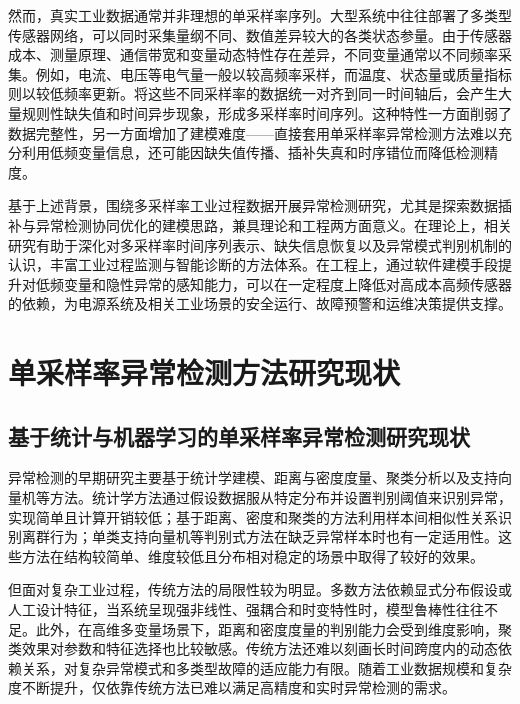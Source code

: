 \documentclass[bachelor, vlined]{DissertUESTC}
\begin{document}
    然而，真实工业数据通常并非理想的单采样率序列。大型系统中往往部署了多类型传感器网络，可以同时采集量纲不同、数值差异较大的各类状态参量。由于传感器成本、测量原理、通信带宽和变量动态特性存在差异，不同变量通常以不同频率采集。例如，电流、电压等电气量一般以较高频率采样，而温度、状态量或质量指标则以较低频率更新。将这些不同采样率的数据统一对齐到同一时间轴后，会产生大量规则性缺失值和时间异步现象，形成多采样率时间序列。这种特性一方面削弱了数据完整性，另一方面增加了建模难度——直接套用单采样率异常检测方法难以充分利用低频变量信息，还可能因缺失值传播、插补失真和时序错位而降低检测精度。

    基于上述背景，围绕多采样率工业过程数据开展异常检测研究，尤其是探索数据插补与异常检测协同优化的建模思路，兼具理论和工程两方面意义。在理论上，相关研究有助于深化对多采样率时间序列表示、缺失信息恢复以及异常模式判别机制的认识，丰富工业过程监测与智能诊断的方法体系。在工程上，通过软件建模手段提升对低频变量和隐性异常的感知能力，可以在一定程度上降低对高成本高频传感器的依赖，为电源系统及相关工业场景的安全运行、故障预警和运维决策提供支撑。

	\section{单采样率异常检测方法研究现状}

	\subsection{基于统计与机器学习的单采样率异常检测研究现状}

    异常检测的早期研究主要基于统计学建模、距离与密度度量、聚类分析以及支持向量机等方法。统计学方法通过假设数据服从特定分布并设置判别阈值来识别异常，实现简单且计算开销较低；基于距离、密度和聚类的方法利用样本间相似性关系识别离群行为；单类支持向量机等判别式方法在缺乏异常样本时也有一定适用性。这些方法在结构较简单、维度较低且分布相对稳定的场景中取得了较好的效果。

    但面对复杂工业过程，传统方法的局限性较为明显。多数方法依赖显式分布假设或人工设计特征，当系统呈现强非线性、强耦合和时变特性时，模型鲁棒性往往不足。此外，在高维多变量场景下，距离和密度度量的判别能力会受到维度影响，聚类效果对参数和特征选择也比较敏感。传统方法还难以刻画长时间跨度内的动态依赖关系，对复杂异常模式和多类型故障的适应能力有限。随着工业数据规模和复杂度不断提升，仅依靠传统方法已难以满足高精度和实时异常检测的需求。
\end{document}
